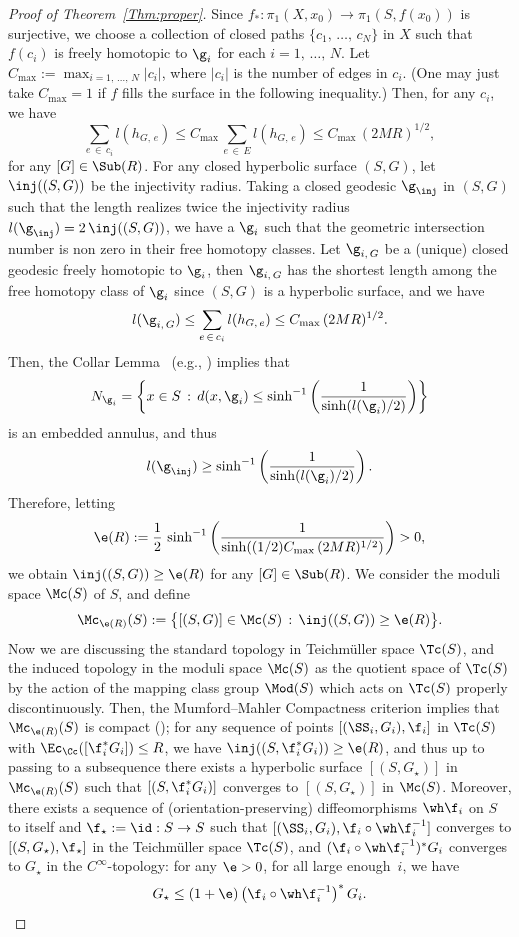 \begin{proof}[{Proof of Theorem~\ref{Thm:proper}}]
Since $f_\ast: \pi_1(X, x_0) \to \pi_1(S, f(x_0))$ is surjective, we choose a collection of closed paths $\{c_1,\,\dots,\, c_N\}$ in $X$ such that $f(c_i)$ is freely homotopic to $\g_i$ for each $i=1,\,\dots,\,N$. Let $C_{\max}:=\max_{i=1,\,\dots,\,N} |c_i|$, where $|c_i|$ is the number of edges in $c_i$. (One may just take $C_{\max}=1$ if $f$ fills the surface in the following inequality.) Then, for any $c_i$, we have
\[
\sum_{e\,\in\,c_i}l\left(h_{G,\,e}\right) \le C_{\max}\, \sum_{e\,\in\,E}l\left(h_{G,\,e}\right) \le C_{\max}\,(2 MR)^{1/2},
\]
for any $[G] \in \Sub(R)$. For any closed hyperbolic surface $(S, G)$, let $\inj((S, G))$ be the injectivity radius. Taking a closed geodesic $\g_{\inj}$ in $(S, G)$ such that the length realizes twice the injectivity radius $l(\g_{\inj})=2\, \inj ((S, G))$, we have a $\g_i$ such that the geometric intersection number is non zero in their free homotopy classes. Let $\g_{i,\,G}$ be a (unique) closed geodesic freely homotopic to $\g_i$, then $\g_{i,\,G}$ has the shortest length among the free homotopy class of $\g_i$ since $(S, G)$ is a hyperbolic surface, and we have
\[
l(\g_{i,\,G}) \le \sum_{e\,\in\,c_i}l(h_{G, \,e}) \le C_{\max}\,(2 MR)^{1/2}.
\]
Then, the Collar Lemma~\cite{Keen} (e.g., \cite[Lemma~13.6]{FarbMargalit}) implies that
\[
N_{\g_i}=\left\{x \in S \, : \, d(x, \g_i) \le \sinh^{-1}\left(\frac{1}{\sinh (l(\g_i)/2)}\right)\right\}
\]
is an embedded annulus, and thus
\[
l(\g_{\inj}) \ge \sinh^{-1}\left(\frac{1}{\sinh (l(\g_i)/2)}\right).
\]
Therefore, letting
\[
\e(R):=\frac{1}{2}\,\sinh^{-1}\left(\frac{1}{\sinh ((1/2)C_{\max}\,(2 MR)^{1/2})}\right)>0,
\]
we obtain $\inj ((S, G)) \ge \e(R)$ for any $[G] \in \Sub(R)$. We consider the moduli space $\Mc(S)$ of $S$, and define
\[
\Mc_{\e(R)}(S):=\big\{[(S, G)] \in \Mc(S) \, : \, \inj((S, G))\ge \e(R) \big\}.
\]
Now we are discussing the standard topology in Teichm\"uller space $\Tc(S)$, and the induced topology in the moduli space $\Mc(S)$ as the quotient space of $\Tc(S)$ by the action of the mapping class group $\Mod(S)$ which acts on $\Tc(S)$ properly discontinuously. Then, the Mumford--Mahler Compactness criterion implies that $\Mc_{\e(R)}(S)$ is compact (\cite[Theorem~C.1]{TrombaBook}); for any sequence of points $[(\SS_i, G_i), \f_i]$ in $\Tc(S)$ with $\Ec_\Cc([\f_i^\ast G_i]) \le R$, we have $\inj((S, \f_i^\ast G_i)) \ge \e(R)$, and thus up to passing to a subsequence there exists a hyperbolic surface $[(S, G_\star)]$ in $\Mc_{\e(R)}(S)$ such that $[(S, \f_i^\ast G_i)]$ converges to $[(S, G_\star)]$ in $\Mc(S)$. Moreover, there exists a sequence of (orientation-preserving) diffeomorphisms $\wh \f_i$ on $S$ to itself and $\f_\star:=\id:S \to S$ such that $[(\SS_i, G_i), \f_i \circ \wh \f_i^{-1}]$ converges to $[(S, G_\star), \f_\star]$ in the Teichm\"uller space $\Tc(S)$, and $(\f_i \circ \wh \f_i^{-1})^\ast G_i$ converges to $G_\star$ in the $C^\infty$-topology: for any $\e>0$, for all large enough~$i$, we have
\begin{equation}\label{Eq:dilatation}
G_\star \le (1+\e)\left(\f_i \circ \wh \f_i^{-1}\right)^\ast G_i.
\end{equation}


\end{proof}
